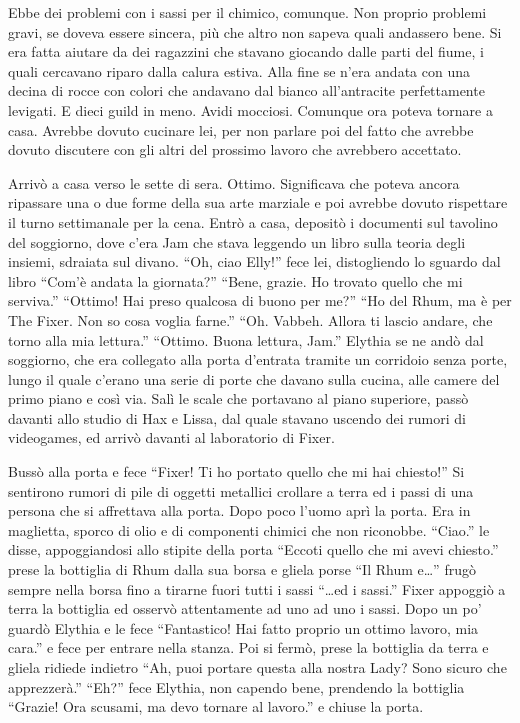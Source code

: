     Ebbe dei problemi con i sassi per il chimico, comunque. Non proprio
    problemi gravi, se doveva essere sincera, più che altro non sapeva
    quali andassero bene. Si era fatta aiutare da dei ragazzini che stavano
    giocando dalle parti del fiume, i quali cercavano riparo dalla calura
    estiva. Alla fine se n'era andata con una decina di rocce con colori
    che andavano dal bianco all'antracite perfettamente levigati. E dieci
    guild in meno. Avidi mocciosi. Comunque ora poteva tornare a casa.
    Avrebbe dovuto cucinare lei, per non parlare poi del fatto che avrebbe
    dovuto discutere con gli altri del prossimo lavoro che avrebbero
    accettato.

    Arrivò a casa verso le sette di sera. Ottimo. Significava che poteva
    ancora ripassare una o due forme della sua arte marziale e poi avrebbe
    dovuto rispettare il turno settimanale per la cena. Entrò a casa,
    depositò i documenti sul tavolino del soggiorno, dove c'era Jam che
    stava leggendo un libro sulla teoria degli insiemi, sdraiata sul
    divano. ``Oh, ciao Elly!'' fece lei, distogliendo lo sguardo dal libro
    ``Com'è andata la giornata?'' ``Bene, grazie. Ho trovato quello che mi
    serviva.'' ``Ottimo! Hai preso qualcosa di buono per me?'' ``Ho del
    Rhum, ma è per The Fixer. Non so cosa voglia farne.'' ``Oh. Vabbeh.
    Allora ti lascio andare, che torno alla mia lettura.'' ``Ottimo. Buona
    lettura, Jam.'' Elythia se ne andò dal soggiorno, che era collegato
    alla porta d'entrata tramite un corridoio senza porte, lungo il quale
    c'erano una serie di porte che davano sulla cucina, alle camere del
    primo piano e così via. Salì le scale che portavano al piano superiore,
    passò davanti allo studio di Hax e Lissa, dal quale stavano uscendo dei
    rumori di videogames, ed arrivò davanti al laboratorio di Fixer.

    Bussò alla porta e fece ``Fixer! Ti ho portato quello che mi hai
    chiesto!'' Si sentirono rumori di pile di oggetti metallici crollare a
    terra ed i passi di una persona che si affrettava alla porta. Dopo poco
    l'uomo aprì la porta. Era in maglietta, sporco di olio e di componenti
    chimici che non riconobbe. ``Ciao.'' le disse, appoggiandosi allo
    stipite della porta ``Eccoti quello che mi avevi chiesto.'' prese la
    bottiglia di Rhum dalla sua borsa e gliela porse ``Il Rhum e\dots{}''
    frugò sempre nella borsa fino a tirarne fuori tutti i sassi ``\dots{}ed
    i sassi.'' Fixer appoggiò a terra la bottiglia ed osservò attentamente
    ad uno ad uno i sassi. Dopo un po' guardò Elythia e le fece
    ``Fantastico! Hai fatto proprio un ottimo lavoro, mia cara.'' e fece
    per entrare nella stanza. Poi si fermò, prese la bottiglia da terra e
    gliela ridiede indietro ``Ah, puoi portare questa alla nostra Lady? Sono
    sicuro che apprezzerà.'' ``Eh?'' fece Elythia, non capendo bene,
    prendendo la bottiglia ``Grazie! Ora scusami, ma devo tornare al
    lavoro.'' e chiuse la porta.

